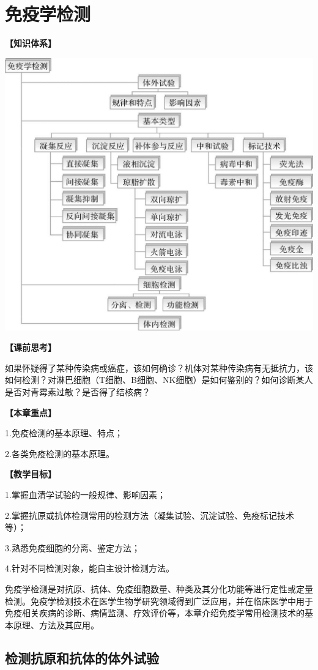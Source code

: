 \chapter{免疫学检测}
\begin{framed}
\noindent\textbf{【知识体系】}
\begin{center}
\includegraphics[width=.6\textwidth]{./images/Image00151.jpg}
\end{center}
\noindent\textbf{【课前思考】}

如果怀疑得了某种传染病或癌症，该如何确诊？机体对某种传染病有无抵抗力，该如何检测？对淋巴细胞（T细胞、B细胞、NK细胞）是如何鉴别的？如何诊断某人是否对青霉素过敏？是否得了结核病？

\noindent\textbf{【本章重点】}

1.免疫检测的基本原理、特点；

2.各类免疫检测的基本原理。

\noindent\textbf{【教学目标】}

1.掌握血清学试验的一般规律、影响因素；

2.掌握抗原或抗体检测常用的检测方法（凝集试验、沉淀试验、免疫标记技术等）；

3.熟悉免疫细胞的分离、鉴定方法；

4.针对不同检测对象，能自主设计检测方法。
\end{framed}

免疫学检测是对抗原、抗体、免疫细胞数量、种类及其分化功能等进行定性或定量检测。免疫学检测技术在医学生物学研究领域得到广泛应用，并在临床医学中用于免疫相关疾病的诊断、病情监测、疗效评价等，本章介绍免疫学常用检测技术的基本原理、方法及其应用。

\section{检测抗原和抗体的体外试验}

